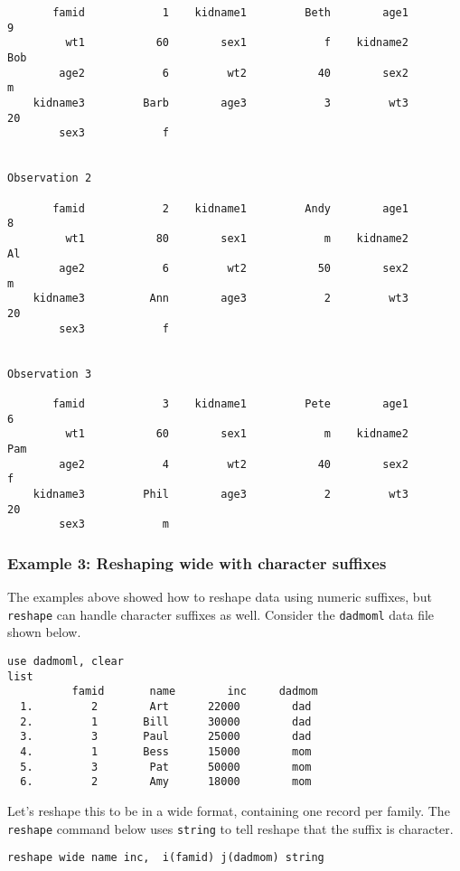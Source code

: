 \begin{lstlisting}
       famid            1    kidname1         Beth        age1            9
         wt1           60        sex1            f    kidname2          Bob
        age2            6         wt2           40        sex2            m
    kidname3         Barb        age3            3         wt3           20
        sex3            f


Observation 2

       famid            2    kidname1         Andy        age1            8
         wt1           80        sex1            m    kidname2           Al
        age2            6         wt2           50        sex2            m
    kidname3          Ann        age3            2         wt3           20
        sex3            f


Observation 3

       famid            3    kidname1         Pete        age1            6
         wt1           60        sex1            m    kidname2          Pam
        age2            4         wt2           40        sex2            f
    kidname3         Phil        age3            2         wt3           20
        sex3            m
\end{lstlisting}

\subsubsection{Example 3: Reshaping wide with character suffixes}

The examples above showed how to reshape data using numeric suffixes, but \lstinline{reshape} can handle character suffixes as well. Consider the \lstinline{dadmoml} data file shown below.

\begin{lstlisting}
use dadmoml, clear
list
          famid       name        inc     dadmom
  1.         2        Art      22000        dad
  2.         1       Bill      30000        dad
  3.         3       Paul      25000        dad
  4.         1       Bess      15000        mom
  5.         3        Pat      50000        mom
  6.         2        Amy      18000        mom
\end{lstlisting}

Let's reshape this to be in a wide format, containing one record per family. The \lstinline{reshape} command below uses \lstinline{string} to tell reshape that the suffix is character.

\begin{lstlisting}
reshape wide name inc,  i(famid) j(dadmom) string
\end{lstlisting}

